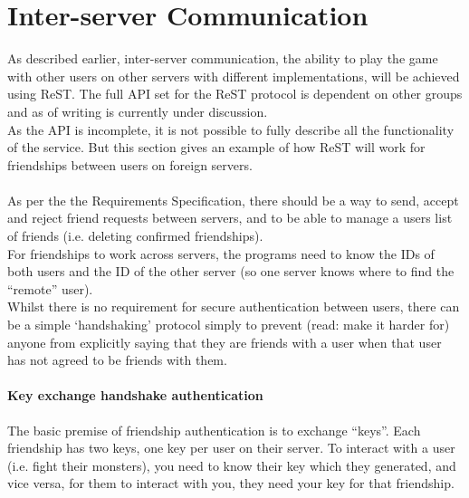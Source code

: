 \section{Inter-server Communication}
As described earlier, inter-server communication, the ability to play the game with other users on other servers with different implementations, will be achieved using ReST. The full API set for the ReST protocol is dependent on other groups and as of writing is currently under discussion.
\\As the API is incomplete, it is not possible to fully describe all the functionality of the service. But this section gives an example of how ReST will work for friendships between users on foreign servers.
\\
\\
As per the the Requirements Specification, there should be a way to send, accept and reject friend requests between servers, and to be able to manage a users list of friends (i.e. deleting confirmed friendships).\\
For friendships to work across servers, the programs need to know the IDs of both users and the ID of the other server (so one server knows where to find the “remote” user).\\
Whilst there is no requirement for secure authentication between users, there can be a simple ‘handshaking’ protocol simply to prevent (read: make it harder for) anyone from explicitly saying that they are friends with a user when that user has not agreed to be friends with them.\\

\paragraph{Key exchange handshake authentication}
The basic premise of friendship authentication is to exchange “keys”.
Each friendship has two keys, one key per user on their server.
To interact with a user (i.e. fight their monsters), you need to know their key which they generated, and vice versa, for them to interact with you, they need your key for that friendship.
